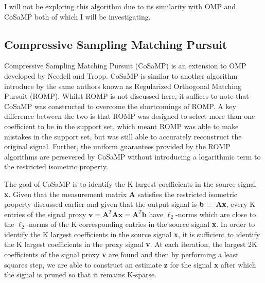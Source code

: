 \documentclass[titlepage,oneside, 12pt]{book}
\theoremstyle{break}
\begin{document}

I will not be exploring this algorithm due to its similarity with OMP and CoSaMP both of which I will be investigating. 



\newpage

\subsection{Compressive Sampling Matching Pursuit}\label{COSAMP}

Compressive Sampling Matching Pursuit (CoSaMP) is an extension to OMP developed by Needell and Tropp\cite{CoSaMP}. CoSaMP is similar to another algorithm introduce by the same authors known as Regularized Orthogonal Matching Pursuit (ROMP)\cite{ROMP1}. Whilst ROMP is not discussed here, it suffices to note that CoSaMP was constructed to overcome the shortcomings of ROMP. A key difference between the two is that ROMP was designed to select more than one coefficient to be in the support set, which meant ROMP was able to make mistakes in the support set, but was still able to accurately reconstruct the original signal. Further, the uniform guarantees provided by the ROMP algorithms are persevered by CoSaMP without introducing a logarithmic term to the restricted isometric property. 

The goal of CoSaMP is to identify the K largest coefficients in the source signal \textbf{x}. Given that the measurement matrix \textbf{A} satisfies the restricted  isometric property discussed earlier and given that the output signal is \textbf{b = Ax}, every K entries of the signal proxy $\textbf{v} = \textbf{A}^{T}\textbf{A}\textbf{x} = \textbf{A}^{T}\textbf{b}$ have $\ell_{2}$-norms which are close to the $\ell_{2}$-norms of the K corresponding entries in the source signal \textbf{x}. In order to identify the K largest coefficients in the source signal \textbf{x}, it is sufficient to identify the K largest coefficients in the proxy signal \textbf{v}.
At each iteration, the largest 2K coefficients of the signal proxy \textbf{v} are found and then by performing a least squares step, we are able to construct an estimate \textbf{z} for the signal \textbf{x} after which the signal is pruned so that it remains K-sparse. 
\end{document}
